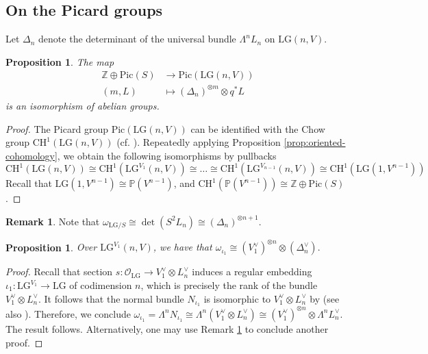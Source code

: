 \documentclass[a4paper]{amsart}
\theoremstyle{plain}
\newtheorem{proposition}[theorem]{Proposition}
\theoremstyle{definition}
\newtheorem{remark}[theorem]{Remark}
\numberwithin{equation}{section}
\newcommand{\Pic}{\mathrm{Pic}}
\newcommand{\LG}{\mathrm{LG}}
\newcommand{\SO}{\mathcal{O}}
\begin{document}
\subsection{On the Picard groups} Let $\Delta_n$ denote the determinant of the universal bundle $\Lambda^nL_n$ on $\LG(n,V)$.
\begin{proposition} The map
    \begin{align*}
        \mathbb{Z} \oplus \Pic(S) & \to \Pic(\LG(n,V))                          \\
        (m, L)                    & \mapsto (\Delta_n)^{\otimes m} \otimes q^*L
    \end{align*}
    is an isomorphism of abelian groups.
\end{proposition}
\begin{proof}
    The Picard group $\Pic(\LG(n,V))$ can be identified with the Chow group $\mathrm{CH}^1(\LG(n,V))$ (cf. \cite[Remark 11.41, p.311]{gortz2020algebraic}). Repeatedly applying Proposition \ref{prop:oriented-cohomology}, we obtain the following isomorphisms by pullbacks
    \[\mathrm{CH}^1(\LG(n,V)) \cong \mathrm{CH}^1(\LG^{V_1}(n,V))  \cong  \ldots \cong \mathrm{CH}^1(\LG^{V_{n-1}}(n,V)) \cong \mathrm{CH}^1(\LG(1,V^{n-1}))  \]
    Recall that $\LG(1,V^{n-1}) \cong \mathbb{P}(V^{n-1})$, and $\mathrm{CH}^1(\mathbb{P}(V^{n-1})) \cong \mathbb{Z} \oplus \Pic(S)$.
\end{proof}
\begin{remark}\label{rmk:LG-omega}
    Note that $\omega_{\LG/S} \cong \det(S^2L_n) \cong  (\Delta_n)^{\otimes n+1}$.
\end{remark}
\begin{proposition}
    Over $\LG^{V_1}(n,V)  $, we have that $\omega_{\iota_1} \cong (V_{1}^\vee)^{\otimes n} \otimes (\Delta_{n}^\vee).$
\end{proposition}
\begin{proof}
    Recall that section $s: \SO_{\LG  } \to V_1^\vee \otimes  L_n^\vee$ induces a regular embedding $\iota_1: \LG^{V_1}   \to \LG  $ of codimension $n$, which is precisely the rank of the bundle $V_1^\vee \otimes  L_n^\vee$. It follows that the normal bundle $N_{\iota_1} $ is isomorphic to $ V_1^\vee \otimes  L_n^\vee$ by \cite[Section 7.2]{calmes2011push} (see also \cite[Remark 6.8]{huang2023the}). Therefore, we conclude $\omega_{\iota_1} = \Lambda^n N_{\iota_1} \cong \Lambda^n(V_1^\vee \otimes  L_n^\vee) \cong (V_1^\vee)^{\otimes n} \otimes \Lambda^nL_n^\vee $. The result follows. Alternatively, one may use Remark \ref{rmk:LG-omega} to conclude another proof.
\end{proof}
\end{document}
